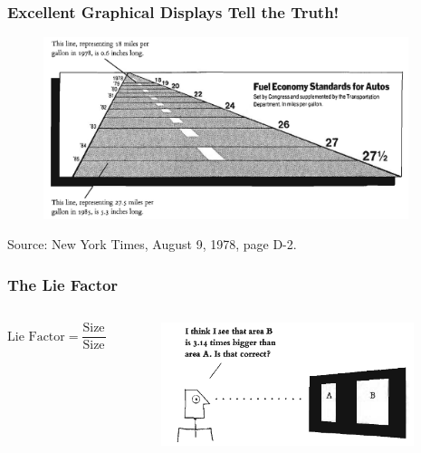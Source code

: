 \documentclass[aspectratio=1610]{beamer}
\begin{document}
\begin{frame}
	\frametitle{Excellent Graphical Displays Tell the Truth!}
	\begin{figure}
		\begin{small}
			\begin{center}
				\includegraphics[width=0.95\textwidth]{
					images/fuel_economy.png}
			\end{center}
		\end{small}
	\end{figure}

	\footnotesize
	Source: New York Times, August 9, 1978, page D-2.
\end{frame}

\begin{frame}
	\frametitle{The Lie Factor}
	\begin{columns}
		\begin{column}{0.5\textwidth}
			\footnotesize
			\begin{equation}
				\text{Lie Factor} = \frac{\text{Size of the effect shown in graphic}}
				{\text{Size of effect in data}}
			\end{equation}
		\end{column}
		\begin{column}{0.5\textwidth}
			\begin{figure}
				\begin{small}
					\begin{center}
						\includegraphics[width=0.95\textwidth]{
							images/is_that_correct.png}
					\end{center}
				\end{small}
			\end{figure}
		\end{column}
	\end{columns}
\end{frame}
\end{document}
